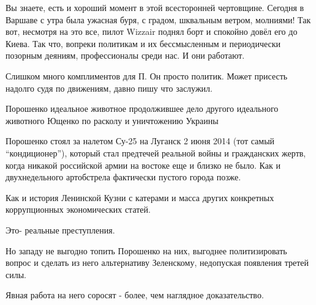 \begin{itemize}

Вы знаете, есть и хороший момент в этой всесторонней чертовщине. Сегодня в
Варшаве с утра была ужасная буря, с градом, шквальным ветром, молниями! Так
вот, несмотря на это все, пилот Wizzair поднял борт и спокойно довёл его до
Киева. Так что, вопреки политикам и их бессмысленным и периодически позорным
деяниям, профессионалы среди нас. И они работают.


Слишком много комплиментов для П. Он просто политик. Может присесть надолго
судя по движениям, давно пишу что заслужил.


Порошенко идеальное животное продолжившее дело другого идеального животного
Ющенко по расколу и уничтожению Украины


Порошенко стоял за налетом Су-25 на Луганск 2 июня 2014 (тот самый
\enquote{кондиционер}), который стал предтечей реальной войны и гражданских жертв,
когда никакой российской армии на востоке еще и близко не было. Как и
двухнедельного артобстрела фактически пустого города позже.

Как и история Ленинской Кузни с катерами и масса других конкретных
коррупционных экономических статей.

Это- реальные преступления.

Но западу не выгодно топить Порошенко на них, выгоднее политизировать вопрос и
сделать из него альтернативу Зеленскому, недопуская появления третей силы.

Явная работа на него соросят - более, чем наглядное доказательство.

\end{itemize} %

